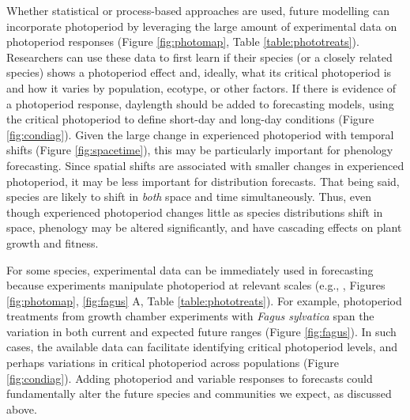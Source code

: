 \documentclass{article}
\begin{document}
%   
\par Whether statistical or process-based approaches are used, future modelling can incorporate photoperiod by leveraging the large amount of experimental data on photoperiod responses (Figure \ref{fig:photomap}, Table \ref{table:phototreats}). Researchers can use these data to first learn if their species (or a closely related species) shows a photoperiod effect and, ideally, what its critical photoperiod is and how it varies by population, ecotype, or other factors. If there is evidence of a photoperiod response, daylength should be added to forecasting models, using the critical photoperiod to define short-day and long-day conditions (Figure \ref{fig:condiag}). Given the large change in experienced photoperiod with temporal shifts (Figure \ref{fig:spacetime}), this may be particularly important for phenology forecasting. Since spatial shifts are associated with smaller changes in experienced photoperiod, it may be less important for distribution forecasts.
That being said, species are likely to shift in \emph{both} space and time simultaneously. Thus, even though experienced photoperiod changes little as species distributions shift in space, phenology may be altered significantly, and have cascading effects on plant growth and fitness\citep{duputie2015}. 
\par For some species, experimental data can be immediately used in forecasting because experiments manipulate photoperiod at relevant scales (e.g., \citet{Basler:2014aa,Heide:2015aa}, Figures \ref{fig:photomap}, \ref{fig:fagus} A, Table \ref{table:phototreats}).  For example, photoperiod treatments from growth chamber experiments with \emph{Fagus sylvatica} span the variation in both current and expected future ranges (Figure \ref{fig:fagus}). In such cases, the available data can facilitate identifying critical photoperiod levels, and perhaps variations in critical photoperiod across populations (Figure \ref{fig:condiag}).  Adding photoperiod and variable responses to forecasts could fundamentally alter the future species and communities we expect, as discussed above. 
\end{document}

